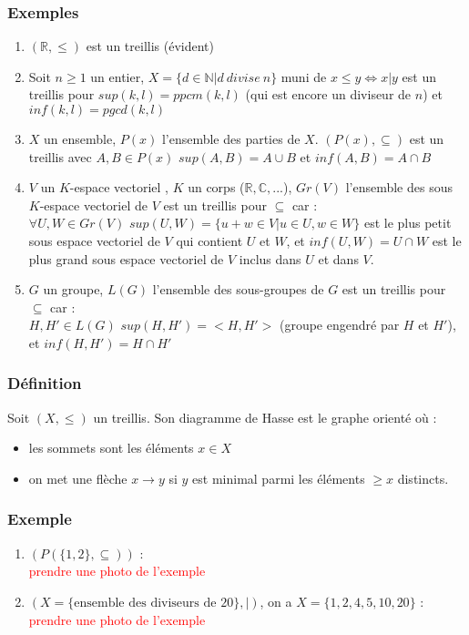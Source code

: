 \documentclass[a4paper, oneside]{report}
\newcommand{\R}{\mathbb{R}}
\newcommand{\N}{\mathbb{N}}
\newcommand{\C}{\mathbb{C}}
\newcommand{\sev}{sous espace vectoriel }
\newcommand{\ev}{espace vectoriel }
\begin{document}
\subsubsection{Exemples}
\begin{enumerate}
\item $(\R , \leq)$ est un treillis (évident)
\item Soit $n\geq 1$ un entier, $X=\{d\in \N | d~divise~n \}$ muni de $x\leq y \Leftrightarrow x|y$ est un treillis pour $sup(k,l)=ppcm(k,l)$ (qui est encore un diviseur de $n$) et $inf(k,l)=pgcd(k,l)$
\item $X$ un ensemble, $P(x)$ l'ensemble des parties de $X$. $(P(x),\subseteq)$ est un treillis avec $A,B\in P(x)$ $sup(A,B)=A\cup B$ et $inf(A,B)=A\cap B$
\item $V$ un $K$-\ev, $K$ un corps ($\R,\C,...$), $Gr(V)$ l'ensemble des sous $K$-\ev de $V$ est un treillis pour $\subseteq$ car :\\
$\forall U,W\in Gr(V)$ $sup(U,W)=\{u+w\in V |u\in U,w\in W \}$ est le plus petit \sev de $V$ qui contient $U$ et $W$, et $inf(U,W)=U\cap W$ est le plus grand \sev de $V$ inclus dans $U$ et dans $V$.\\
\item $G$ un groupe, $L(G)$ l'ensemble des sous-groupes de $G$ est un treillis pour $\subseteq$ car :\\
$H,H'\in L(G)$ $sup(H,H')=<H,H'>$ (groupe engendré par $H$ et $H'$), et $inf(H,H')=H\cap H'$
\end{enumerate}

\subsubsection{Définition}
Soit $(X,\leq )$ un treillis. Son diagramme de Hasse est le graphe orienté où :
\begin{itemize}
\item les sommets sont les éléments $x\in X$
\item on met une flèche $x\rightarrow y$ si $y$ est minimal parmi les éléments $\geq x$ distincts.
\end{itemize}

\subsubsection{Exemple}
\begin{enumerate}
\item $(P(\{1,2\},\subseteq))$ :\\
\textcolor{red}{prendre une photo de l'exemple}

\item $(X=\{\text{ensemble des diviseurs de 20}\}, |)$, on a $X=\{1,2,4,5,10,20\}$ :\\
\textcolor{red}{prendre une photo de l'exemple}
\end{enumerate}
\end{document}
